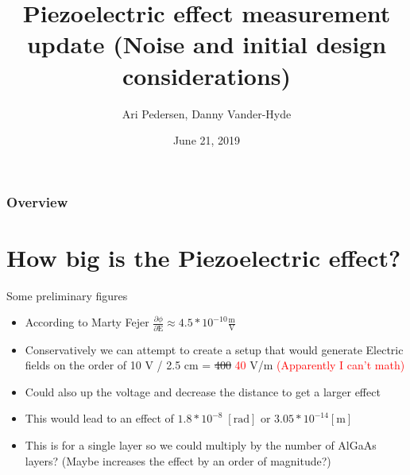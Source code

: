 \documentclass{beamer}
\title[Short title]{Piezoelectric effect measurement update (Noise and initial design considerations)} %
\author{Ari Pedersen, Danny Vander-Hyde} %
\institute[Syracuse University] %
{
Syracuse University\\ %
\medskip
}
\date{June 21, 2019} %
\begin{document}
\begin{frame}
\titlepage %
\end{frame}

\begin{frame}
\frametitle{Overview} %
\tableofcontents %
\end{frame}


\section{How big is the Piezoelectric effect?}
\begin{frame}{Some preliminary figures}
\begin{itemize}
  \item According to Marty Fejer $\frac{\partial \phi}{\partial \mathrm{E}} \approx 4.5*10^{-10} \frac{\mathrm{m}}{\mathrm{V}}$
  \item Conservatively we can attempt to create a setup that would generate Electric fields on the order of 10 V / 2.5 cm = \sout{400} \textcolor{red}{40} V/m \textcolor{red}{(Apparently I can't math)}
  \item Could also up the voltage and decrease the distance to get a larger effect
  \item This would lead to an effect of $1.8*10^{-8} \; [\mathrm{rad}]$ or $3.05*10^{-14} [\mathrm{m}]$
  \item This is for a single layer so we could multiply by the number of AlGaAs layers? (Maybe increases the effect by an order of magnitude?)
\end{itemize}
\end{frame}
\end{document}

